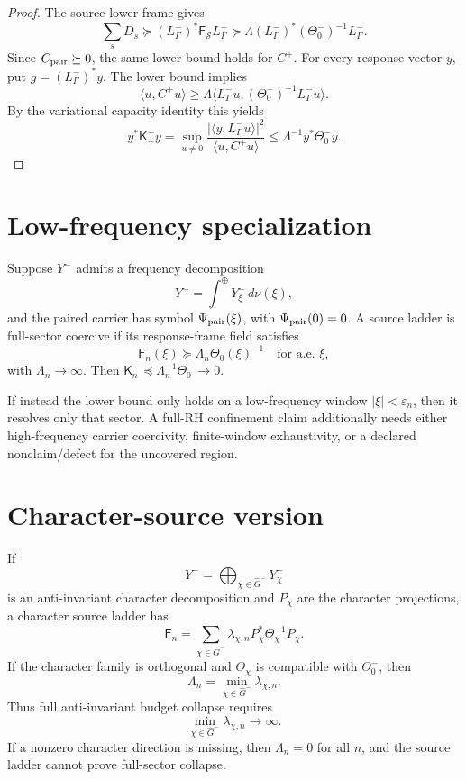 \documentclass[11pt]{article}
\newcommand{\K}{\mathsf K}
\newcommand{\F}{\mathsf F}
\newcommand{\Thetaop}{\Theta_0^-}
\newcommand{\Y}{Y^-}
\begin{document}
\begin{proof}
The source lower frame gives
\[
  \sum_sD_s\succeq (L^-_\Gamma)^*\F_{\mathcal S}L^-_\Gamma
  \succeq \Lambda (L^-_\Gamma)^*(\Thetaop)^{-1}L^-_\Gamma.
\]
Since \(C_{\rm pair}\succeq0\), the same lower bound holds for \(C^+\).  For every response vector \(y\), put \(g=(L^-_\Gamma)^*y\).  The lower bound implies
\[
  \langle u,C^+u\rangle\ge \Lambda\langle L^-_\Gamma u,(\Thetaop)^{-1}L^-_\Gamma u\rangle.
\]
By the variational capacity identity this yields
\[
  y^*\K^-_+y
  =\sup_{u\ne0}\frac{|\langle y,L^-_\Gamma u\rangle|^2}{\langle u,C^+u\rangle}
  \le \Lambda^{-1}y^*\Thetaop y.
\]
\end{proof}

\section{Low-frequency specialization}

Suppose \(\Y\) admits a frequency decomposition
\[
  \Y=\int^\oplus \Y_\xi\,d\nu(\xi),
\]
and the paired carrier has symbol \(\Psi_{\rm pair}(\xi)\), with \(\Psi_{\rm pair}(0)=0\).  A source ladder is full-sector coercive if its response-frame field satisfies
\[
  \F_n(\xi)\succeq \Lambda_n \Theta_0(\xi)^{-1}
\quad\text{for a.e. }\xi,
\]
with \(\Lambda_n\to\infty\).  Then \(\K^-_n\preceq \Lambda_n^{-1}\Theta_0^-\to0\).

If instead the lower bound only holds on a low-frequency window \(|\xi|<\varepsilon_n\), then it resolves only that sector.  A full-RH confinement claim additionally needs either high-frequency carrier coercivity, finite-window exhaustivity, or a declared nonclaim/defect for the uncovered region.

\section{Character-source version}

If
\[
  \Y=\bigoplus_{\chi\in\widehat G^-}\Y_\chi
\]
is an anti-invariant character decomposition and \(P_\chi\) are the character projections, a character source ladder has
\[
  \F_n=\sum_{\chi\in\widehat G^-}\lambda_{\chi,n}P_\chi^*\Theta_\chi^{-1}P_\chi.
\]
If the character family is orthogonal and \(\Theta_\chi\) is compatible with \(\Theta_0^-\), then
\[
  \Lambda_n=\min_{\chi\in\widehat G^-}\lambda_{\chi,n}.
\]
Thus full anti-invariant budget collapse requires
\[
  \min_{\chi\in\widehat G^-}\lambda_{\chi,n}\to\infty.
\]
If a nonzero character direction is missing, then \(\Lambda_n=0\) for all \(n\), and the source ladder cannot prove full-sector collapse.
\end{document}
